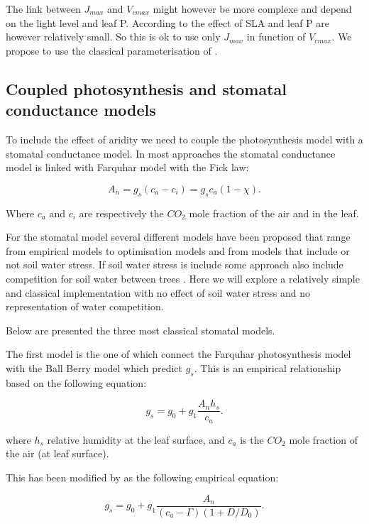 \documentclass[a4paper,11pt]{article}
\begin{document}
The link between $J_{max}$ and $V_{cmax}$ might however be more
complexe and depend on the light level and leaf P. According to
\citet{Walker-2014} the effect of SLA and leaf P are however
relatively small. So this is ok to use only $J_{max}$ in function of
$V_{cmax}$. We propose to use the classical parameterisation of \citet{Medlyn-2002} .

\subsection{Coupled photosynthesis and stomatal conductance models}

To include the effect of aridity we need to couple the photosynthesis model with a stomatal conductance model. In most approaches the stomatal conductance model is linked with Farquhar model with the Fick law:

\begin{equation}
\label{eq:fick}
A_n = g_s (c_a - c_i) = g_s c_a (1-\chi).
\end{equation}

Where $c_a$ and $c_i$ are respectively the $CO_2$ mole fraction of the air and in the leaf.

For the stomatal model several different models have been proposed
that range from empirical models to optimisation models and from
models that include or not soil water stress. If soil water stress is
include some approach also include competition for soil water between
trees \citep{Farrior-2013}. Here we will explore a relatively simple
and classical implementation with no effect of soil water stress and
no representation of water competition.

Below are presented the three most classical stomatal models.

The first model is the one of \citet{Collatz-1991} which connect the Farquhar photosynthesis model with the Ball Berry model which predict $g_s$. This is an empirical relationship based on the following equation:

\begin{equation}
\label{eq:gs-Ball}
g_s= g_0 + g_1 \frac{A_n h_s}{c_a}.
\end{equation}

where $h_s$ relative humidity at the leaf surface, and $c_a$ is the $CO_2$ mole fraction of the air (at leaf surface).

This has been modified by \citet{Leuning-1995} as the following empirical equation:

\begin{equation}
\label{eq:gs-Leuning}
g_s= g_0 + g_1 \frac{A_n }{(c_a - \Gamma)(1+D/D_0)}.
\end{equation}
\end{document}
